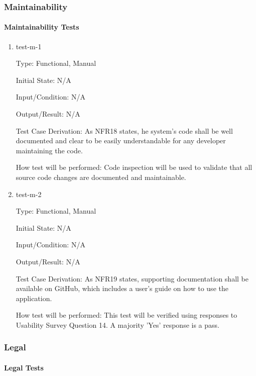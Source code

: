 \documentclass[12pt, titlepage]{article}
\begin{document}
\subsubsection{Maintainability}

\paragraph{Maintainability Tests}

\begin{enumerate}

\item{test-m-1\\}

Type: Functional, Manual		

Initial State: N/A	

Input/Condition: N/A		

Output/Result: N/A

Test Case Derivation: As NFR18 states, he system's code shall be well documented and clear to be easily understandable for any developer maintaining the code.

How test will be performed: Code inspection will be used to validate that all source code changes are documented and maintainable. 

\item{test-m-2\\}

Type: Functional, Manual

Initial State: N/A

Input/Condition: N/A

Output/Result: N/A

Test Case Derivation: As NFR19 states, supporting documentation shall be available on GitHub, which includes a user's guide on how to use the application.	

How test will be performed: This test will be verified using responses to Usability Survey Question 14. A majority 'Yes' response is a pass.

\end{enumerate}

\subsubsection{Legal}

\paragraph{Legal Tests}
\end{document}
